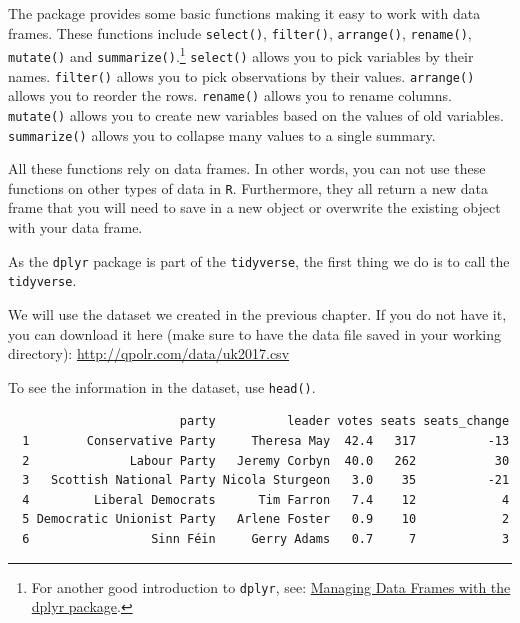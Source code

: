 \documentclass[12pt,oneside]{reedthesis}
\theoremstyle{definition}
\theoremstyle{definition}
\theoremstyle{definition}
\theoremstyle{remark}
\begin{document}
  The package provides some basic functions making it easy to work with
  data frames. These functions include \texttt{select()},
  \texttt{filter()}, \texttt{arrange()}, \texttt{rename()},
  \texttt{mutate()} and \texttt{summarize()}.\footnote{For another good
    introduction to \texttt{dplyr}, see:
    \href{https://bookdown.org/rdpeng/rprogdatascience/managing-data-frames-with-the-dplyr-package.html}{Managing
    Data Frames with the dplyr package}.} \texttt{select()} allows you to
  pick variables by their names. \texttt{filter()} allows you to pick
  observations by their values. \texttt{arrange()} allows you to reorder
  the rows. \texttt{rename()} allows you to rename columns.
  \texttt{mutate()} allows you to create new variables based on the values
  of old variables. \texttt{summarize()} allows you to collapse many
  values to a single summary.
  
  All these functions rely on data frames. In other words, you can not use
  these functions on other types of data in \texttt{R}. Furthermore, they
  all return a new data frame that you will need to save in a new object
  or overwrite the existing object with your data frame.
  
  As the \texttt{dplyr} package is part of the \texttt{tidyverse}, the
  first thing we do is to call the \texttt{tidyverse}.
  \begin{Shaded}
  \begin{Highlighting}[]
  \NormalTok{(}\NormalTok{)}
  \end{Highlighting}
  \end{Shaded}
  We will use the dataset we created in the previous chapter. If you do
  not have it, you can download it here (make sure to have the data file
  saved in your working directory): \url{http://qpolr.com/data/uk2017.csv}
  \begin{Shaded}
  \begin{Highlighting}[]
  \StringTok{ }\NormalTok{(}\NormalTok{)}
  \end{Highlighting}
  \end{Shaded}
  To see the information in the dataset, use \texttt{head()}.
  \begin{Shaded}
  \begin{Highlighting}[]
  \end{Highlighting}
  \end{Shaded}
  \begin{verbatim}
                        party          leader votes seats seats_change
  1        Conservative Party     Theresa May  42.4   317          -13
  2              Labour Party   Jeremy Corbyn  40.0   262           30
  3   Scottish National Party Nicola Sturgeon   3.0    35          -21
  4         Liberal Democrats      Tim Farron   7.4    12            4
  5 Democratic Unionist Party   Arlene Foster   0.9    10            2
  6                 Sinn Féin     Gerry Adams   0.7     7            3
  \end{verbatim}
\end{document}
